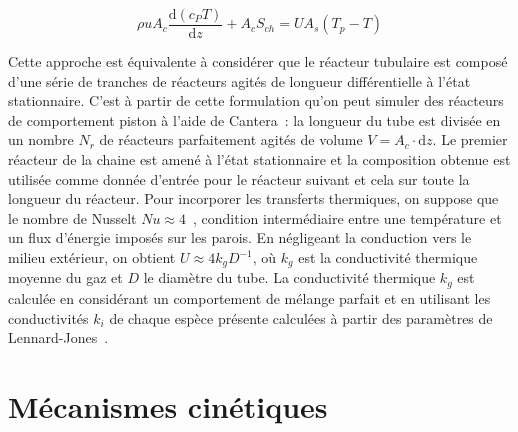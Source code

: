 \begin{equation}
\rho uA_{c}\frac{\mathrm{d}\left(c_{P}T\right)}{\mathrm{d}z}+A_{c}S_{ch}=
UA_{s}\left(T_{p}-T\right)
\label{eq:energy_balance_convection}
\end{equation}

Cette approche est équivalente à considérer que le réacteur tubulaire est composé d'une série de \og{}tranches\fg{} de réacteurs agités de longueur différentielle à l'état stationnaire. C'est à partir de cette formulation qu'on peut simuler des réacteurs de comportement piston à l'aide de Cantera~\cite{Cantera2014}: la longueur du tube est divisée en un nombre $N_{r}$ de réacteurs parfaitement agités de volume $V=A_{c}\cdot{\mathrm{d}z}$. Le premier réacteur de la chaine est amené à l'état stationnaire et la composition obtenue est utilisée comme donnée d'entrée pour le réacteur suivant et cela sur toute la longueur du réacteur. Pour incorporer les transferts thermiques, on suppose que le nombre de Nusselt $Nu\approx{}4$~\cite{Incropera2011}, condition intermédiaire entre une température et un flux d'énergie imposés sur les parois. En négligeant la conduction vers le milieu extérieur, on obtient $U\approx{}4k_{g}D^{-1}$, où $k_{g}$ est la conductivité thermique moyenne du gaz et $D$ le diamètre du tube. La conductivité thermique $k_{g}$ est calculée en considérant un comportement de mélange parfait et en utilisant les conductivités $k_i$ de chaque espèce présente calculées à partir des paramètres de Lennard-Jones~\cite{Bird}.

\section{Mécanismes cinétiques}
\label{sec:mecanismes-cinetiques}

